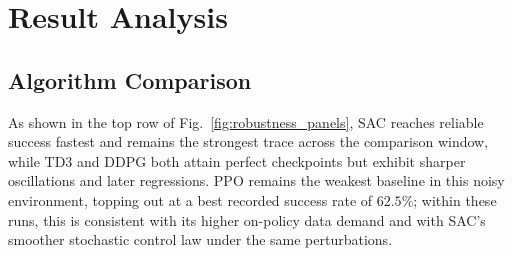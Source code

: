 \documentclass[runningheads]{llncs}
\begin{document}
\begin{table}[!tb]
\caption{Training configurations used for the reported policy-comparison, Kalman-ablation, and distillation experiments.}
\label{tab:train_hparams}
\centering
\scriptsize
{}
\end{table}

\section{Result Analysis}
\subsection{Algorithm Comparison}
As shown in the top row of Fig.~\ref{fig:robustness_panels}, SAC reaches reliable success fastest and remains the strongest trace across the comparison window, while TD3 and DDPG both attain perfect checkpoints but exhibit sharper oscillations and later regressions. PPO remains the weakest baseline in this noisy environment, topping out at a best recorded success rate of $62.5\%$; within these runs, this is consistent with its higher on-policy data demand and with SAC's smoother stochastic control law under the same perturbations.
\end{document}
